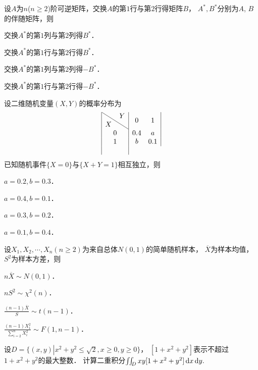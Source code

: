 \documentclass[plain,noanswer,medmath]{../../template/jnuexam}
\begin{document}
\begin{problem}
设$A$为$n$($n \ge 2$)阶可逆矩阵，交换$A$的第$1$行与第$2$行得矩阵$B$，
$A^*,B^*$分别为$A$, $B$的伴随矩阵，则\pickout{}
\begin{abcd}
\item 交换$A^*$的第$1$列与第$2$列得$B^*$．
\item 交换$A^*$的第$1$行与第$2$行得$B^*$．
\item 交换$A^*$的第$1$列与第$2$列得$- B^*$．
\item 交换$A^*$的第$1$行与第$2$行得$- B^*$．
\end{abcd}
\end{problem}


\begin{problem}
设二维随机变量$(X,Y)$的概率分布为
$$\begin{array}{|c|cc|}
\hline
  \diagboxtwo{X}{Y} &   0 & 1 \\
\hline
                  0 & 0.4 & a \\
                  1 &   b & 0.1 \\
\hline
\end{array}$$
已知随机事件$\{X = 0\}$与$\{X + Y = 1\}$相互独立，则\pickout{}
\begin{abcd}
\item $a = 0.2,b = 0.3$．
\item $a = 0.4,b = 0.1$．
\item $a = 0.3,b = 0.2$．
\item $a = 0.1,b = 0.4$．
\end{abcd}
\end{problem}


\begin{problem}
设$X_1,X_2, \cdots ,X_n(n \ge 2)$为来自总体$N(0,1)$的简单随机样本，
$\overline{X}$为样本均值，$S^2$为样本方差，则\pickout{}
\begin{abcd}
\item $n\overline{X}\sim N(0,1)$．
\item $nS^2\sim \chi^2(n)$．
\item $\frac{(n - 1)\overline{X}}{S}\sim t(n - 1)$．
\item $\frac{(n - 1)X_1^2}{\sum_{i = 2}^n X_i^2}\sim F(1,n - 1)$．
\end{abcd}
\end{problem}




\begin{problem}[points=11]
设$D = \{(x,y)\left| x^2 + y^2 \le \sqrt{2} ,x \ge 0,y \ge 0 \right.\}$，
$[1 + x^2 + y^2]$表示不超过$1 + x^2 + y^2$的最大整数．
计算二重积分$\iint_D xy[1 + x^2 + y^2]\mathop{}\!\mathrm{d} x\mathop{}\!\mathrm{d} y.$
\end{problem}
\end{document}
